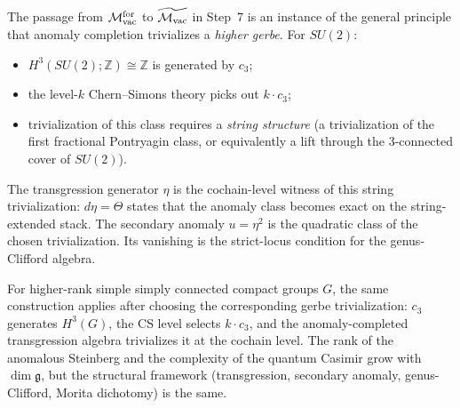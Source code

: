 \begin{remark}
\label{rem:su2-string-structure}
The passage from $\mathcal{M}_{\mathrm{vac}}^{\mathrm{for}}$ to $\widetilde{\mathcal{M}_{\mathrm{vac}}}$ in Step~7 is
an instance of the general principle that anomaly completion
trivializes a \emph{higher gerbe}. For $SU(2)$:
\begin{itemize}
\item $H^3(SU(2);\mathbb Z)\cong\mathbb Z$ is generated by $c_3$;
\item the level-$k$ Chern--Simons theory picks out $k\cdot c_3$;
\item trivialization of this class requires a \emph{string structure}
 (a trivialization of the first fractional Pontryagin class, or
 equivalently a lift through the $3$-connected cover of $SU(2)$).
\end{itemize}
The transgression generator $\eta$ is the cochain-level witness of
this string trivialization: $d\eta = \Theta$ states that the anomaly
class becomes exact on the string-extended stack. The secondary
anomaly \(u=\eta^2\) is the quadratic class of the chosen
trivialization.  Its vanishing is the strict-locus condition for the
genus-Clifford algebra.

For higher-rank simple simply connected compact groups \(G\), the
same construction applies after choosing the corresponding gerbe
trivialization:
$c_3$ generates $H^3(G)$, the CS level selects $k\cdot c_3$, and
the anomaly-completed transgression algebra trivializes it at the
cochain level. The rank of the anomalous Steinberg and the
complexity of the quantum Casimir grow with
$\dim\mathfrak{g}$, but the structural framework
(transgression, secondary anomaly, genus-Clifford, Morita
dichotomy) is the same.
\end{remark}

